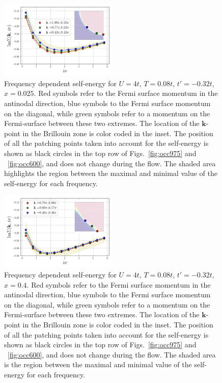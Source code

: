 \begin{figure}
\includegraphics[width=0.50\textwidth]{images/Self_Im_occ0975.png}
\caption{Frequency dependent self-energy for $U=4t$, $T=0.08t$, $t'=-0.32t$, $x=0.025$.
Red symbols refer to the Fermi surface momentum in the antinodal direction,  blue symbols to the Fermi surface momentum on the diagonal, while  green symbols refer to a momentum on the Fermi-surface between these two extremes. 
The location of the $\mathbf{k}$-point in the Brillouin zone is color coded in the inset.  
The position of all the patching points taken into account for the self-energy is shown as black circles in the top row of Figs.~\ref{fig:occ975} and ~\ref{fig:occ600}, and does not change during the flow.
The shaded area highlights the region between the maximal and minimal value of the self-energy for each frequency. }
\label{fig:selffermi0975}
\end{figure}


\begin{figure}
\includegraphics[width=0.50\textwidth]{images/Self_Im_occ0600.png}
\caption{Frequency dependent self-energy for $U=4t$, $T=0.08t$, $t'=-0.32t$, $x=0.4$.
Red symbols refer to the Fermi surface momentum in the antinodal direction,  blue symbols to the Fermi surface momentum on the diagonal, while  green symbols refer to a momentum on the Fermi-surface between these two extremes. 
The location of the $\mathbf{k}$-point in the Brillouin zone is color coded in the inset.  
The position of all the patching points taken into account for the self-energy is shown as black circles in the top row of Figs.~\ref{fig:occ975} and ~\ref{fig:occ600}, and does not change during the flow.
The shaded area is the region between the maximal and minimal value of the self-energy for each frequency.}
\label{fig:selffermi0600}
\end{figure}

